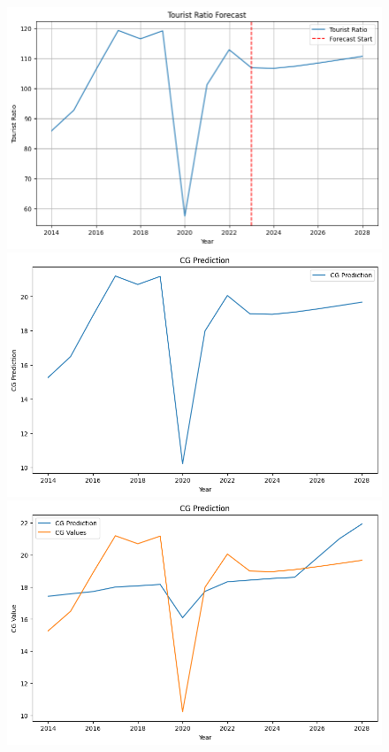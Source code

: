 \begin{figure}[H]
    \centering
    \begin{minipage}[t]{0.32\textwidth}
        \centering
        \includegraphics[width=1\textwidth]{Ratio_Sitka.png}
    \end{minipage}
    \hfill
    \begin{minipage}[t]{0.32\textwidth}
        \centering
        \includegraphics[width=1\textwidth]{CG_Sitka.png}
    \end{minipage}
    \hfill
    \begin{minipage}[t]{0.32\textwidth}
        \centering
        \includegraphics[width=1\textwidth]{CG_Pred_Sitka.png}
    \end{minipage}
\end{figure}


